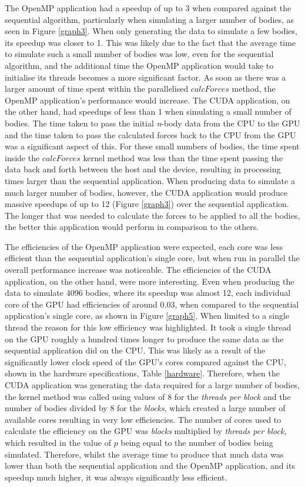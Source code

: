 \documentclass[12pt,journal,transmag]{IEEEtran}
\begin{document}
	The OpenMP application had a speedup of up to 3 when compared against the sequential algorithm, particularly when simulating a larger number of bodies, as seen in Figure \ref{graph3}. When only generating the data to simulate a few bodies, its speedup was closer to 1. This was likely due to the fact that the average time to simulate such a small number of bodies was low, even for the sequential algorithm, and the additional time the OpenMP application would take to initialise its threads becomes a more significant factor. As soon as there was a larger amount of time spent within the parallelised $calcForces$ method, the OpenMP application's performance would increase. The CUDA application, on the other hand, had speedups of less than 1 when simulating a small number of bodies. The time taken to pass the initial \textit{n}-body data from the CPU to the GPU and the time taken to pass the calculated forces back to the CPU from the GPU was a significant aspect of this. For these small numbers of bodies, the time spent inside the $calcForces$ kernel method was less than the time spent passing the data back and forth between the host and the device, resulting in processing times larger than the sequential application. When producing data to simulate a much larger number of bodies, however, the CUDA application would produce massive speedups of up to 12 (Figure \ref{graph3}) over the sequential application. The longer that was needed to calculate the forces to be applied to all the bodies, the better this application would perform in comparison to the others.
	
	The efficiencies of the OpenMP application were expected, each core was less efficient than the sequential application's single core, but when run in parallel the overall performance increase was noticeable. The efficiencies of the CUDA application, on the other hand, were more interesting. Even when producing the data to simulate 4096 bodies, where its speedup was almost 12, each individual core of the GPU had efficiencies of around 0.03, when compared to the sequential application's single core, as shown in Figure \ref{graph5}. When limited to a single thread the reason for this low efficiency was highlighted. It took a single thread on the GPU roughly a hundred times longer to produce the same data as the sequential application did on the CPU. This was likely as a result of the significantly lower clock speed of the GPU's cores compared against the CPU, shown in the hardware specifications, Table \ref{hardware}. Therefore, when the CUDA application was generating the data required for a large number of bodies, the kernel method was called using values of 8 for the \textit{threads per block} and the number of bodies divided by 8 for the \textit{blocks}, which created a large number of available cores resulting in very low efficiencies. The number of cores used to calculate the efficiency on the GPU was \textit{blocks} multiplied by \textit{threads per block}, which resulted in the value of $p$ being equal to the number of bodies being simulated. Therefore, whilst the average time to produce that much data was lower than both the sequential application and the OpenMP application, and its speedup much higher, it was always significantly less efficient.
	
\end{document}
